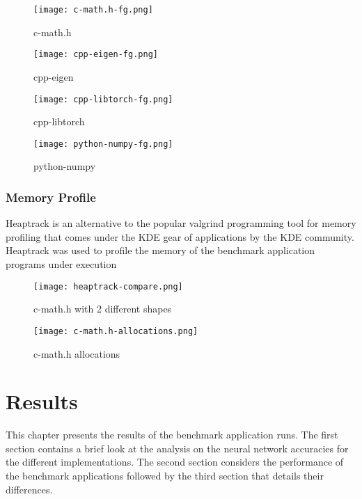 \begin{figure}[h]
	\centering
	\texttt{[image: c-math.h-fg.png]}
	\caption{c-math.h}
\end{figure}

\begin{figure}[h]
	\centering
	\texttt{[image: cpp-eigen-fg.png]}
	\caption{cpp-eigen}
\end{figure}

\begin{figure}[h]
	\centering
	\texttt{[image: cpp-libtorch-fg.png]}
	\caption{cpp-libtorch}
\end{figure}

\begin{figure}[h]
	\centering
	\texttt{[image: python-numpy-fg.png]}
	\caption{python-numpy}
\end{figure}

\subsection{Memory Profile}

Heaptrack is an alternative to the popular valgrind programming tool for memory profiling that comes under the KDE gear of applications by the KDE community. Heaptrack was used to profile the memory of the benchmark application programs under execution

\begin{figure}[h]
	\centering
	\texttt{[image: heaptrack-compare.png]}
	\caption{c-math.h with 2 different shapes}
\end{figure}

\begin{figure}[h]
	\centering
	\texttt{[image: c-math.h-allocations.png]}
	\caption{c-math.h allocations}
\end{figure}


\chapter{Results}

This chapter presents the results of the benchmark application runs. The first section contains a brief look at the analysis on the neural network accuracies for the different implementations. The second section considers the performance of the benchmark applications followed by the third section that details their differences.

